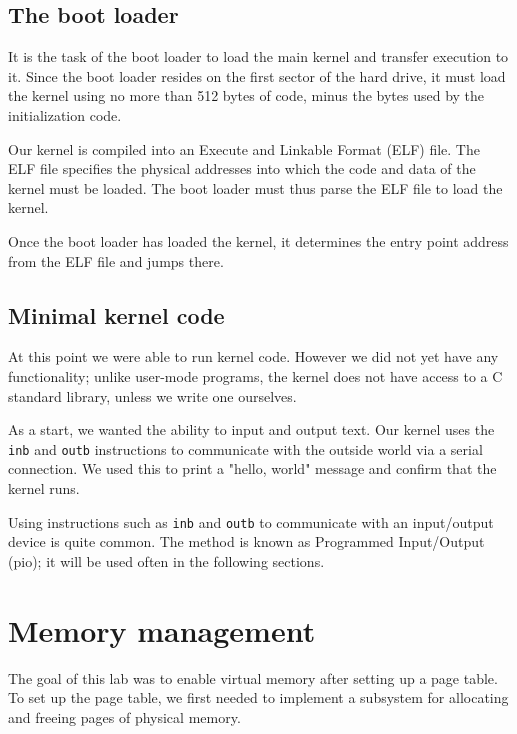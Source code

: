 \documentclass{report}
\begin{document}



\section{The boot loader}
It is the task of the boot loader to load the main kernel and transfer
execution to it. Since the boot loader resides on the first sector of the hard
drive, it must load the kernel using no more than 512 bytes of code, minus the
bytes used by the initialization code.

Our kernel is compiled into an Execute and Linkable Format (ELF) file. The ELF
file specifies the physical addresses into which the code and data of the
kernel must be loaded. The boot loader must thus parse the ELF file to load
the kernel.

Once the boot loader has loaded the kernel, it determines the entry point
address from the ELF file and jumps there.


\section{Minimal kernel code}
At this point we were able to run kernel code. However we did not yet have any
functionality; unlike user-mode programs, the kernel does not have access to a
C standard library, unless we write one ourselves.

As a start, we wanted the ability to input and output text.
Our kernel uses the \texttt{inb} and \texttt{outb} instructions to
communicate with the outside world via a serial connection. We used this to
print a "hello, world" message and confirm that the kernel runs.

Using instructions such as \texttt{inb} and \texttt{outb} to communicate with
an input/output device is quite common. The method is known as Programmed
Input/Output (\gls{pio}); it will be used often in the following sections.



\chapter{Memory management}
\label{sec:mem}
The goal of this lab was to enable virtual memory after setting up a page
table. To set up the page table, we first needed to implement a subsystem
for allocating and freeing pages of physical memory.
\end{document}
